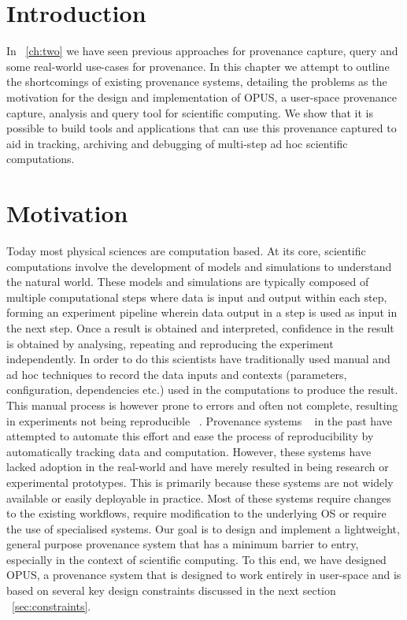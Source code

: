 \documentclass[withindex,glossary]{cam-thesis}
\begin{document}
\section{Introduction}
In ~\ref{ch:two} we have seen previous approaches for provenance capture, query and some real-world use-cases for provenance. In this chapter we attempt to outline the shortcomings of existing provenance systems, detailing the problems as the motivation for the design and implementation of OPUS, a user-space provenance capture, analysis and query tool for scientific computing. We show that it is possible to build tools and applications that can use this provenance captured to aid in tracking, archiving and debugging of multi-step ad hoc scientific computations.

\section{Motivation}
Today most physical sciences are computation based.
At its core, scientific computations involve the development of models and simulations to understand the natural world. 
These models and simulations are typically composed of multiple computational steps where data is input and output within each step, forming an experiment pipeline wherein data output in a step is used as input in the next step.
Once a result is obtained and interpreted, confidence in the result is obtained by analysing, repeating and reproducing the experiment independently.
In order to do this scientists have traditionally used manual and ad hoc techniques to record the data inputs and contexts (parameters, configuration, dependencies etc.) used in the computations to produce the result.
This manual process is however prone to errors and often not complete, resulting in experiments not being reproducible ~\cite{non-rep, nature}. 
Provenance systems ~\cite{PASS, BURRITO, StoyBook} in the past have attempted to automate this effort and ease the process of reproducibility by automatically tracking data and computation.
However, these systems have lacked adoption in the real-world and have merely resulted in being research or experimental prototypes.
This is primarily because these systems are not widely available or easily deployable in practice.
Most of these systems require changes to the existing workflows, require modification to the underlying OS or require the use of specialised systems.
Our goal is to design and implement a lightweight, general purpose provenance system that has a minimum barrier to entry, especially in the context of scientific computing.
To this end, we have designed OPUS, a provenance system that is designed to work entirely in user-space and is based on several key design constraints discussed in the next section ~\ref{sec:constraints}.
\end{document}
